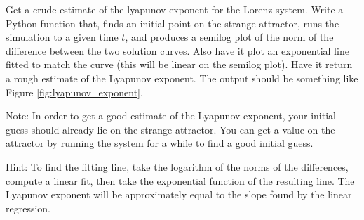 \begin{problem}
Get a crude estimate of the lyapunov exponent for the Lorenz system.
Write a Python function that, finds an initial point on the strange attractor, runs the simulation to a given time $t$, and produces a semilog plot of the norm of the difference between the two solution curves.
Also have it plot an exponential line fitted to match the curve (this will be linear on the semilog plot).
Have it return a rough estimate of the Lyapunov exponent.
The output should be something like Figure \ref{fig:lyapunov_exponent}.

Note: In order to get a good estimate of the Lyapunov exponent, your initial guess should already lie on the strange attractor.
You can get a value on the attractor by running the system for a while to find a good initial guess.

Hint: To find the fitting line, take the logarithm of the norms of the differences, compute a linear fit, then take the exponential function of the resulting line.
The Lyapunov exponent will be approximately equal to the slope found by the linear regression.
\end{problem}